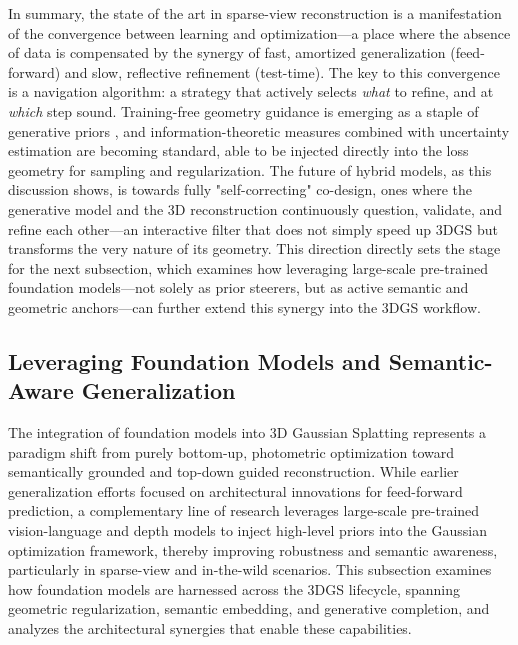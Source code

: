 \documentclass[11pt,a4paper]{article}
\begin{document}
In summary, the state of the art in sparse-view reconstruction is a manifestation of the convergence between learning and optimization---a place where the absence of data is compensated by the synergy of fast, amortized generalization (feed-forward) and slow, reflective refinement (test-time). The key to this convergence is a navigation algorithm: a strategy that actively selects \emph{what} to refine, and at \emph{which} step sound. Training-free geometry guidance is emerging as a staple of generative priors \cite{arxiv:2106.03283v1,arxiv:2312.16084v2}, and information-theoretic measures \cite{arxiv:2407.11309v1} combined with uncertainty estimation \cite{arxiv:1308.3229v3} are becoming standard, able to be injected directly into the loss geometry for sampling and regularization. The future of hybrid models, as this discussion shows, is towards fully "self-correcting" co-design, ones where the generative model and the 3D reconstruction continuously question, validate, and refine each other---an interactive filter that does not simply speed up 3DGS but transforms the very nature of its geometry. This direction directly sets the stage for the next subsection, which examines how leveraging large-scale pre-trained foundation models---not solely as prior steerers, but as active semantic and geometric anchors---can further extend this synergy into the 3DGS workflow.


\subsection{Leveraging Foundation Models and Semantic-Aware Generalization}


\cite{arxiv:2306.06812v1}
The integration of foundation models into 3D Gaussian Splatting represents a paradigm shift from purely bottom-up, photometric optimization toward semantically grounded and top-down guided reconstruction. While earlier generalization efforts focused on architectural innovations for feed-forward prediction, a complementary line of research leverages large-scale pre-trained vision-language and depth models to inject high-level priors into the Gaussian optimization framework, thereby improving robustness and semantic awareness, particularly in sparse-view and in-the-wild scenarios. This subsection examines how foundation models are harnessed across the 3DGS lifecycle, spanning geometric regularization, semantic embedding, and generative completion, and analyzes the architectural synergies that enable these capabilities.
\end{document}
